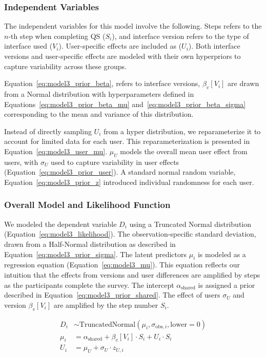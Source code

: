 \subsubsection{Independent Variables}
The independent variables for this model involve the following. Steps refers to the $n$-th step when completing QS ($S_i$), and interface version refers to the type of interface used ($V_i$). User-specific effects are included as ($U_i$). Both interface versions and user-specific effects are modeled with their own hyperpriors to capture variability across these groups. 

Equation~\ref{eq:model3_prior_beta}, refers to interface versions, $\beta_v[V_i]$ are drawn from a Normal distribution with hyperparameters defined in Equations~\ref{eq:model3_prior_beta_mu} and~\ref{eq:model3_prior_beta_sigma} corresponding to the mean and variance of this distribution. 

Instead of directly sampling $U_i$ from a hyper distribution, we reparameterize it to account for limited data for each user. This reparameterization is presented in Equation~\ref{eq:model3_user_mu}. $\mu_{U}$ models the overall mean user effect from users, with $\sigma_{U}$ used to capture variability in user effects (Equation~\ref{eq:model3_prior_user}). A standard normal random variable, Equation~\ref{eq:model3_prior_z} introduced individual randomness for each user.


\subsubsection{Overall Model and Likelihood Function}
We modeled the dependent variable $D_i$ using a Truncated Normal distribution (Equation~\ref{eq:model3_likelihood}). The observation-specific standard deviation, drawn from a Half-Normal distribution as described in Equation~\ref{eq:model3_prior_sigma}. The latent predictors $\mu_i$ is modeled as a regression equation (Equation~\ref{eq:model3_mu}). This equation reflects our intuition that the effects from versions and user differences are amplified by steps as the participants complete the survey. The intercept $\alpha_{\text{shared}}$ is assigned a prior described in Equation~\ref{eq:model3_prior_shared}. The effect of users $\sigma_{U}$ and version $\beta_v[V_i]$ are amplified by the step number $S_i$.


\begin{align}
    D_i &\sim \text{TruncatedNormal}(\mu_i, \sigma_{\text{obs},i}, \text{lower}=0) \label{eq:model3_likelihood} \\
    \mu_i &= \alpha_{\text{shared}} + \beta_v[V_i] \cdot S_i + U_i \cdot S_i \label{eq:model3_mu} \\
    U_i &= \mu_{U} + \sigma_{U} \cdot z_{U,i} \label{eq:model3_user_mu}
\end{align}

